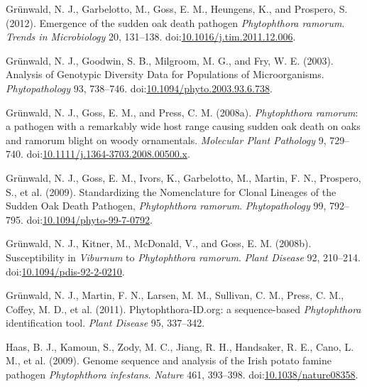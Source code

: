 \documentclass[double,12pt]{beavtex}
\begin{document}
  \hypertarget{ref-grunwald2012emergence}{}
  Grünwald, N. J., Garbelotto, M., Goss, E. M., Heungens, K., and
  Prospero, S. (2012). Emergence of the sudden oak death pathogen
  \emph{Phytophthora ramorum}. \emph{Trends in Microbiology} 20, 131--138.
  doi:\href{https://doi.org/10.1016/j.tim.2011.12.006}{10.1016/j.tim.2011.12.006}.
  
  \hypertarget{ref-grunwald2003analysis}{}
  Grünwald, N. J., Goodwin, S. B., Milgroom, M. G., and Fry, W. E. (2003).
  Analysis of Genotypic Diversity Data for Populations of Microorganisms.
  \emph{Phytopathology} 93, 738--746.
  doi:\href{https://doi.org/10.1094/phyto.2003.93.6.738}{10.1094/phyto.2003.93.6.738}.
  
  \hypertarget{ref-grunwald2008phytophthora}{}
  Grünwald, N. J., Goss, E. M., and Press, C. M. (2008a).
  \emph{Phytophthora ramorum}: a pathogen with a remarkably wide host
  range causing sudden oak death on oaks and ramorum blight on woody
  ornamentals. \emph{Molecular Plant Pathology} 9, 729--740.
  doi:\href{https://doi.org/10.1111/j.1364-3703.2008.00500.x}{10.1111/j.1364-3703.2008.00500.x}.
  
  \hypertarget{ref-grunwald2009standardizing}{}
  Grünwald, N. J., Goss, E. M., Ivors, K., Garbelotto, M., Martin, F. N.,
  Prospero, S., et al. (2009). Standardizing the Nomenclature for Clonal
  Lineages of the Sudden Oak Death Pathogen, \emph{Phytophthora ramorum}.
  \emph{Phytopathology} 99, 792--795.
  doi:\href{https://doi.org/10.1094/phyto-99-7-0792}{10.1094/phyto-99-7-0792}.
  
  \hypertarget{ref-grunwald2008susceptibility}{}
  Grünwald, N. J., Kitner, M., McDonald, V., and Goss, E. M. (2008b).
  Susceptibility in \emph{Viburnum} to \emph{Phytophthora ramorum}.
  \emph{Plant Disease} 92, 210--214.
  doi:\href{https://doi.org/10.1094/pdis-92-2-0210}{10.1094/pdis-92-2-0210}.
  
  \hypertarget{ref-grunwald2011phytophthora}{}
  Grünwald, N. J., Martin, F. N., Larsen, M. M., Sullivan, C. M., Press,
  C. M., Coffey, M. D., et al. (2011). Phytophthora-ID.org: a
  sequence-based \emph{Phytophthora} identification tool. \emph{Plant
  Disease} 95, 337--342.
  
  \hypertarget{ref-haas2009genome}{}
  Haas, B. J., Kamoun, S., Zody, M. C., Jiang, R. H., Handsaker, R. E.,
  Cano, L. M., et al. (2009). Genome sequence and analysis of the Irish
  potato famine pathogen \emph{Phytophthora infestans}. \emph{Nature} 461,
  393--398.
  doi:\href{https://doi.org/10.1038/nature08358}{10.1038/nature08358}.
  
\end{document}
